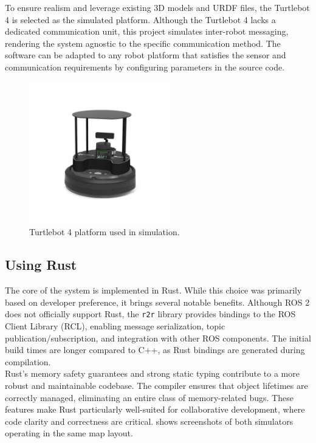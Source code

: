 To ensure realism and leverage existing 3D models and URDF files, the Turtlebot 4 \cite{tb4} is selected as the simulated platform. Although the Turtlebot 4 lacks a dedicated communication unit, this project simulates inter-robot messaging, rendering the system agnostic to the specific communication method. The software can be adapted to any robot platform that satisfies the sensor and communication requirements by configuring parameters in the source code.

\begin{figure}[h]
    \begin{center}
        \includegraphics[width=0.55\textwidth]{figures/tb4.png}
    \end{center}
    \caption{Turtlebot 4 platform used in simulation.}
    \label{fig:tb4}
\end{figure}


\subsection{Using Rust}
The core of the system is implemented in Rust. While this choice was primarily based on developer preference, it brings several notable benefits. Although ROS 2 does not officially support Rust, the \texttt{r2r} library \cite{r2r} provides bindings to the ROS Client Library (RCL), enabling message serialization, topic publication/subscription, and integration with other ROS components. The initial build times are longer compared to C++, as Rust bindings are generated during compilation.\\


Rust's memory safety guarantees and strong static typing contribute to a more robust and maintainable codebase. The compiler ensures that object lifetimes are correctly managed, eliminating an entire class of memory-related bugs. These features make Rust particularly well-suited for collaborative development, where code clarity and correctness are critical.  shows screenshots of both simulators operating in the same map layout.

